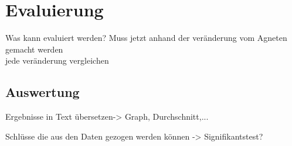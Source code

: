 \chapter{Evaluierung}%

\label{cha:Eval}

Was kann evaluiert werden? \colorbox{red!30}{Muss jetzt anhand der veränderung vom Agneten gemacht werden}\\
\colorbox{red!30}{jede veränderung vergleichen}


\section{Auswertung}
\colorbox{red!30}{Ergebnisse in Text übersetzen-> Graph, Durchschnitt,...}

\colorbox{red!30}{Schlüsse die aus den Daten gezogen werden können -> Signifikantstest?}





